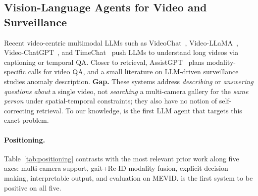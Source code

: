 \subsection{Vision-Language Agents for Video and Surveillance}
\label{ssec:rel_vlmagents}
Recent video-centric multimodal LLMs such as
VideoChat~\cite{li2023videochat}, Video-LLaMA~\cite{zhang2023videollama},
Video-ChatGPT~\cite{maaz2023videochatgpt}, and
TimeChat~\cite{ren2024timechat} push LLMs to understand long videos via
captioning or temporal QA. Closer to retrieval, AssistGPT~\cite{gao2023assistgpt}
plans modality-specific calls for video QA, and a small literature on
LLM-driven surveillance studies anomaly description. \textbf{Gap.} These
systems address \emph{describing} or \emph{answering questions about} a
single video, not \emph{searching} a multi-camera gallery for the
\emph{same person} under spatial-temporal constraints; they also have no
notion of self-correcting retrieval. To our knowledge, \method{} is the
first LLM agent that targets this exact problem.

\paragraph{Positioning.} Table~\ref{tab:positioning} contrasts \method{}
with the most relevant prior work along five axes: multi-camera support,
gait+Re-ID modality fusion, explicit decision making, interpretable
output, and evaluation on MEVID. \method{} is the first system to be
positive on all five.

